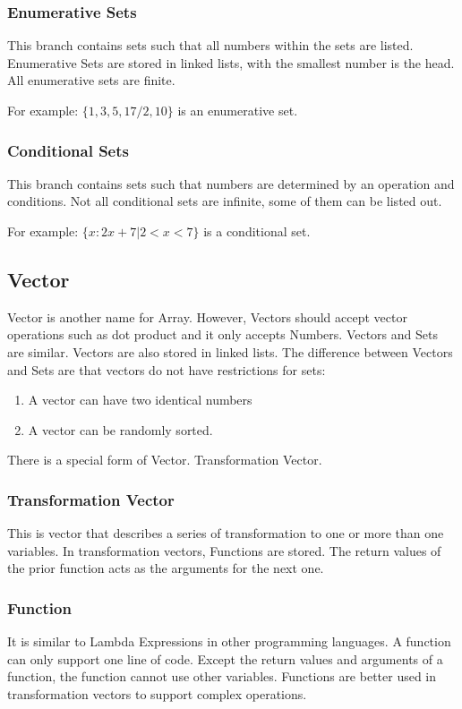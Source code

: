 \documentclass[12pt, a4paper]{IEEEtran}
\begin{document}
	\subsubsection{Enumerative Sets}
	This branch contains sets such that all numbers within the sets are listed. Enumerative Sets are stored in linked lists, with the smallest number is the head. All enumerative sets are finite.
		
	For example: $\{1, 3, 5, 17/2, 10\}$ is an enumerative set.
		
	\subsubsection{Conditional Sets}
	This branch contains sets such that numbers are determined by an operation and conditions. Not all conditional sets are infinite, some of them can be listed out. 
		
	For example: $\{x:2x+7|2<x<7\}$ is a conditional set.
		
\subsection{Vector}
	Vector is another name for Array. However, Vectors should accept vector operations such as dot product and it only accepts Numbers. Vectors and Sets are similar. Vectors are also stored in linked lists. The difference between Vectors and Sets are that vectors do not have restrictions for sets:
	\begin{enumerate}
	\item A vector can have two identical numbers
	\item A vector can be randomly sorted.
	\end{enumerate}
	There is a special form of Vector. Transformation Vector.
	
	\subsubsection{Transformation Vector}
	This is vector that describes a series of transformation to one or more than one variables. In transformation vectors, Functions are stored. The return values of the prior function acts as the arguments for the next one.
	
	\subsubsection{Function}
	It is similar to Lambda Expressions in other programming languages. A function can only support one line of code. Except the return values and arguments of a function, the function cannot use other variables. Functions are better used in transformation vectors to support complex operations.
	
\end{document}

